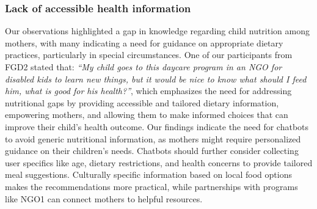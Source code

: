 \subsubsection{Lack of accessible health information} 
Our observations highlighted a gap in knowledge regarding child nutrition among mothers, with many indicating a need for guidance on appropriate dietary practices, particularly in special circumstances. One of our participants from FGD2 stated that: \textit{``My child goes to this daycare program in an NGO for disabled kids to learn new things, but it would be nice to know what should I feed him, what is good for his health?''}, which emphasizes the need for addressing nutritional gaps by providing accessible and tailored dietary information, empowering mothers, and allowing them to make informed choices that can improve their child's health outcome. 
Our findings indicate the need for chatbots to avoid generic nutritional information, as mothers might require personalized guidance on their children's needs. Chatbots should further consider collecting user specifics like age, dietary restrictions, and health concerns to provide tailored meal suggestions. Culturally specific information based on local food options makes the recommendations more practical, while partnerships with programs like NGO1 can connect mothers to helpful resources.








